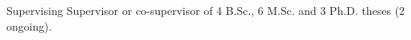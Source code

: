 \begin{rubric}{Supervising}
\entry*[]
  Supervisor or co-supervisor of 4 B.Sc., 6 M.Sc. and 3 Ph.D. theses (2 ongoing).
\end{rubric}
